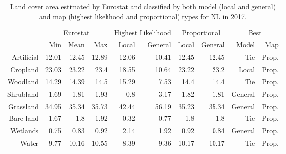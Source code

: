     \begin{table}[H]
    \centering
    \caption{Land cover area estimated by Eurostat and classified by both model (local and general) and map (highest likelihood and proportional) types for NL in 2017.}
    
    \begin{tabular}{r|rrr|rr|rr|rr}
    \toprule
    {} & \multicolumn{3}{|c}{Eurostat} & \multicolumn{2}{|c}{Highest Likelihood} & \multicolumn{2}{|c}{Proportional} & \multicolumn{2}{|c}{Best} \\
    {} &      Min &   Mean &    Max &              Local & General &        Local & General &    Model &    Map \\
    \midrule
    Artificial &    12.01 &  12.45 &  12.89 &              12.06 &   10.41 &        12.45 &   12.45 &      Tie &  Prop. \\
    Cropland   &    23.03 &  23.22 &   23.4 &              18.55 &   10.64 &        23.22 &    23.2 &    Local &  Prop. \\
    Woodland   &    14.29 &  14.39 &   14.5 &              15.29 &    7.53 &         14.4 &    14.4 &      Tie &  Prop. \\
    Shrubland  &     1.69 &   1.81 &   1.93 &                0.8 &    3.17 &         1.82 &    1.81 &  General &  Prop. \\
    Grassland  &    34.95 &  35.34 &  35.73 &              42.44 &   56.19 &        35.23 &   35.34 &  General &  Prop. \\
    Bare land  &     1.67 &    1.8 &   1.92 &               0.32 &    0.77 &          1.8 &     1.8 &      Tie &  Prop. \\
    Wetlands   &     0.75 &   0.83 &   0.92 &               2.14 &    1.92 &         0.92 &    0.84 &  General &  Prop. \\
    Water      &     9.77 &  10.16 &  10.55 &               8.39 &    9.36 &        10.17 &   10.17 &      Tie &  Prop. \\
    \bottomrule
    \end{tabular}
    \end{table}
    
